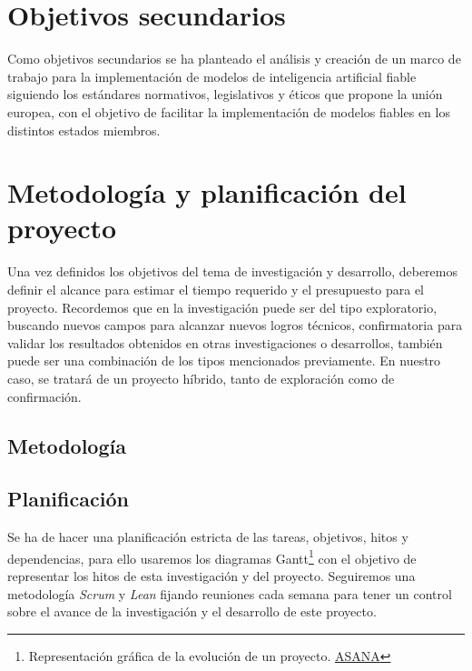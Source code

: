 
\section{Objetivos secundarios}
Como objetivos secundarios se ha planteado el análisis y creación de un marco de trabajo para la implementación de modelos de inteligencia artificial fiable siguiendo los estándares normativos, legislativos y éticos que propone la unión europea, con el objetivo de facilitar la implementación de modelos fiables en los distintos estados miembros.

\section{Metodología y planificación del proyecto}

Una vez definidos los objetivos del tema de investigación y desarrollo, deberemos definir el alcance para estimar el tiempo requerido y el presupuesto para el proyecto.
Recordemos que en la investigación puede ser del tipo exploratorio, buscando nuevos campos para alcanzar nuevos logros técnicos, confirmatoria para validar los resultados obtenidos en otras investigaciones o desarrollos, también puede ser una combinación de los tipos mencionados previamente.
En nuestro caso, se tratará de un proyecto híbrido, tanto de exploración como de confirmación.


\subsection{Metodología}


\subsection{Planificación}

Se ha de hacer una planificación estricta de las tareas, objetivos, hitos y dependencias, para ello usaremos los diagramas Gantt\footnote{Representación gráfica de la evolución de un proyecto. \href{https://asana.com/es/resources/gantt-chart-basics}{ASANA}} con el objetivo de representar los hitos de esta investigación y del proyecto.
Seguiremos una metodología \textit{Scrum} y \textit{Lean} fijando reuniones cada semana para tener un control sobre el avance de la investigación y el desarrollo de este proyecto.

